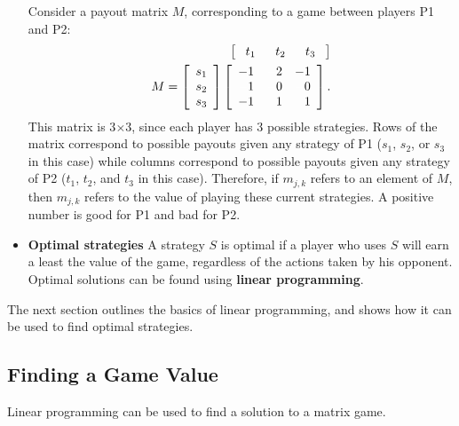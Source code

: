 \documentclass[11pt]{article}
\begin{document}
\begin{itemize}
Consider a payout matrix $M$, corresponding to a game between players
P1 and P2:
\begin{align*}
\setlength\arraycolsep{8pt}
\left[ {\begin{array}{ccc}
t_1 & t_2 & t_3
\end{array} } \right]\\
M= \left[ {\begin{array}{c}
s_1 \\
s_2 \\
s_3 \\
\end{array} } \right]
\left[ {\begin{array}{ccc}
-1 & \textcolor{white}{-}2 & -1\\
\textcolor{white}{-}1 & \textcolor{white}{-}0 & \textcolor{white}{-}0\\
-1 & \textcolor{white}{-}1 & \textcolor{white}{-}1\\
\end{array} } \right].
\end{align*}
This matrix is 3$\times$3, since each player has 3 possible
strategies. Rows of the matrix correspond to possible payouts given
any strategy of P1 ($s_1$, $s_2$, or $s_3$ in this case) while
columns correspond to possible payouts given any strategy of P2
($t_1$, $t_2$, and $t_3$ in this case). Therefore, if $m_{j,k}$
refers to an element of $M$, then $m_{j,k}$ refers to the value of
playing these current strategies. A positive number is good for P1
and bad for P2.
\item \textbf{Optimal strategies} A strategy $S$ is optimal if a
player who uses $S$ will earn a least the value of the game,
regardless of the actions taken by his opponent. Optimal solutions
can be found using \textbf{linear programming}.
\end{itemize}

The next section outlines the basics of linear programming, and shows how it can be used to find optimal strategies.


\subsection{Finding a Game Value}
Linear programming can be used to find a solution to a matrix game.
\end{document}
